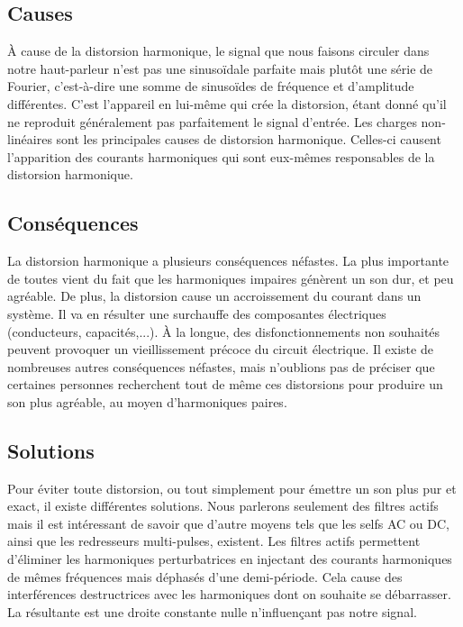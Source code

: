 \subsection{Causes}
À cause de la distorsion harmonique, le signal que nous faisons circuler dans notre haut-parleur n'est pas
une sinusoïdale parfaite mais plutôt une série de Fourier, c'est-à-dire une somme de sinusoïdes de 
fréquence et d'amplitude différentes. C'est l'appareil en lui-même qui crée la distorsion, étant donné 
qu'il ne reproduit généralement pas parfaitement le signal d'entrée. 
Les charges non-linéaires sont les principales causes de distorsion harmonique. Celles-ci causent 
l'apparition des courants harmoniques qui sont eux-mêmes responsables de la distorsion harmonique.

\subsection{Conséquences}
La distorsion harmonique a plusieurs conséquences néfastes.
La plus importante de toutes vient du fait que les harmoniques impaires génèrent un son dur, et peu agréable. De plus, la distorsion cause un accroissement 
du courant dans un système. Il va en résulter une surchauffe des composantes électriques (conducteurs, 
capacités,...). À la longue, des disfonctionnements non souhaités peuvent provoquer un vieillissement 
précoce du circuit électrique. Il existe de nombreuses autres conséquences néfastes, mais n'oublions pas de préciser que certaines personnes recherchent tout de même ces distorsions pour produire un son plus agréable, au moyen d'harmoniques paires.

\subsection{Solutions}
Pour éviter toute distorsion, ou tout simplement pour émettre un son plus pur et exact, 
il existe différentes solutions. Nous parlerons seulement des filtres actifs 
mais il est intéressant de savoir que d'autre moyens tels que les selfs AC ou DC, ainsi que les redresseurs
multi-pulses, existent. 
Les filtres actifs permettent d'éliminer les harmoniques perturbatrices en injectant des courants
harmoniques de mêmes fréquences mais déphasés d'une demi-période. Cela cause des interférences
destructrices avec les harmoniques dont on souhaite se débarrasser. La résultante est une droite constante
nulle n'influençant pas notre signal.

